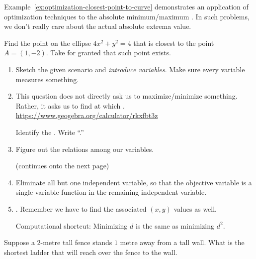 \documentclass[../main.tex]{subfiles}
\begin{document}
  \medskip
  Example~\ref{ex:optimization-closest-point-to-curve} demonstrates an application of optimization techniques to  the absolute minimum/maximum . In such problems, we don't really care about the actual absolute extrema value. 

  \begin{example} \label{ex:optimization-closest-point-to-curve}
    Find the point on the ellipse \(4x^{2} + y^{2} = 4\) that is closest to the point \(A = (1,-2)\). Take for granted that such point exists.

    \begin{enumerate}
      \item Sketch the given scenario and \emph{introduce variables}. Make sure every variable measures something. 

      \item This question does not directly ask us to maximize/minimize something. Rather, it asks us to find \underline{\hspace{1in}} at which \underline{\hspace{2in}}. \url{https://www.geogebra.org/calculator/rkxfbt3z}

        Identify the . Write ``\emph{}.''

      \item Figure out the relations among our variables. 

        \vfill{}{\footnotesize (continues onto the next page)} \clearpage

      \item Eliminate all but one independent variable, so that the objective variable is a single-variable function in the remaining independent variable. 

      \item {}. Remember we have to find the associated \((x,y)\) values as well. 

        Computational shortcut: Minimizing \(d\) is the same as minimizing \(d^{2}\).
    \end{enumerate}
  \end{example}
  \clearpage

  \clearpage

  \begin{example} \label{ex:optimization-ladder}
    Suppose a \(2\)-metre tall fence stands \(1\) metre away from a tall wall.  What is the shortest ladder that will reach over the fence to the wall.
  \end{example}
  \clearpage
\end{document}
